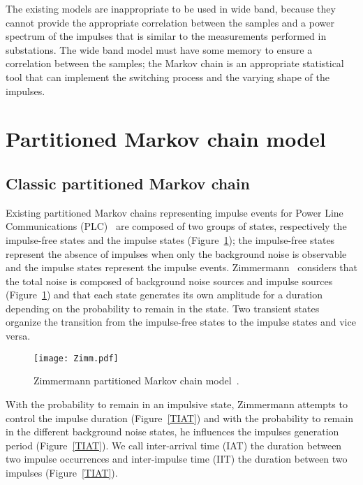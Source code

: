 \documentclass[journal]{IEEEtran}
\begin{document}
The existing models are inappropriate to be used in wide band, because they cannot provide the appropriate correlation between the samples and a power spectrum of the impulses that is similar to the measurements performed in substations. The wide band model must have some memory to ensure a correlation between the samples; the Markov chain is an appropriate statistical tool that can implement the switching process and the varying shape of the impulses.
\section{Partitioned Markov chain model}

\subsection{Classic partitioned Markov chain}
Existing partitioned Markov chains representing impulse events for Power Line Communications (PLC)~\cite{zimmermann} are composed of two groups of states, respectively the impulse-free states and the impulse states (Figure~\ref{zimm}); the impulse-free states represent the absence of impulses when only the background noise is observable and the impulse states represent the impulse events. Zimmermann~\cite{zimmermann} considers that the total noise is composed of  background noise sources and  impulse sources (Figure~\ref{zimm}) and that each state generates its own amplitude for a duration depending on the probability to remain in the state. Two transient states organize the transition from the impulse-free states to the impulse states and vice versa.\\
\begin{figure}[h]
\begin{center}
  \texttt{[image: Zimm.pdf]}\\
\end{center}
  \caption{Zimmermann partitioned Markov chain model~\cite{zimmermann}.}\label{zimm}
\end{figure}
With the probability to remain in an impulsive state, Zimmermann attempts to control the impulse duration  (Figure~\ref{TIAT}) and with the probability to remain in the different background noise states, he influences the impulses generation period  (Figure~\ref{TIAT}). We call inter-arrival time (IAT) the duration between two impulse occurrences and inter-impulse time (IIT) the duration between two impulses (Figure~\ref{TIAT}).\
\end{document}
